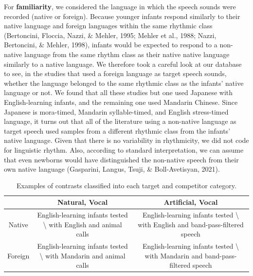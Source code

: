 \documentclass[
  man,mask,floatsintext]{apa6}
\begin{document}
For \textbf{familiarity}, we considered the language in which the speech sounds were recorded (native or foreign). Because younger infants respond similarly to their native language and foreign languages within the same rhythmic class (Bertoncini, Floccia, Nazzi, \& Mehler, 1995; Mehler et al., 1988; Nazzi, Bertoncini, \& Mehler, 1998), infants would be expected to respond to a non-native language from the same rhythm class as their native native language similarly to a native language. We therefore took a careful look at our database to see, in the studies that used a foreign language as target speech sounds, whether the language belonged to the same rhythmic class as the infants' native language or not. We found that all these studies but one used Japanese with English-learning infants, and the remaining one used Mandarin Chinese. Since Japanese is mora-timed, Mandarin syllable-timed, and English stress-timed language, it turns out that all of the literature using a non-native language as target speech used samples from a different rhythmic class from the infants' native language. Given that there is no variability in rhythmicity, we did not code for linguistic rhythm. Also, according to standard interpretation, we can assume that even newborns would have distinguished the non-native speech from their own native language (Gasparini, Langus, Tsuji, \& Boll-Avetisyan, 2021).

\begin{table}[tbp]

\begin{center}
\begin{threeparttable}

\caption{\label{tab:TableStim}Examples of contrasts classified into each target and competitor category.}

\begin{tabular}{ccc}
\toprule
 & \multicolumn{1}{c}{Natural, Vocal} & \multicolumn{1}{c}{Artificial, Vocal}\\
\midrule
Native & English-learning infants tested \textbackslash{} with English and animal calls & English-learning infants tested \textbackslash{} with English and band-pass-filtered speech\\
Foreign & English-learning infants tested \textbackslash{} with Mandarin and animal calls & English-learning infants tested \textbackslash{} with Mandarin and band-pass-filtered speech\\
\bottomrule
\end{tabular}

\end{threeparttable}
\end{center}

\end{table}
\end{document}
